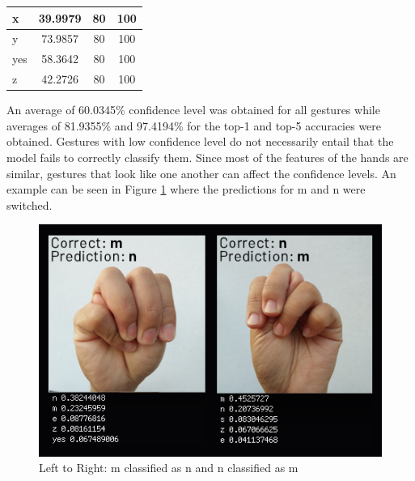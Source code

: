 \documentclass[journal]{./IEEE/IEEEtran}
\begin{document}
\begin{table}[ht!]
\begin{tabular}{|l|c|c|c|}
x                                      & 39.9979                   & 80                      & 100                     \\ \hline
y                                      & 73.9857                   & 80                      & 100                     \\ \hline
yes                                    & 58.3642                   & 80                      & 100                     \\ \hline
z                                      & 42.2726                   & 80                      & 100                     \\ \hline
\end{tabular}
\end{table}

\indent An average of 60.0345\% confidence level was obtained for all gestures while averages of 81.9355\% and 97.4194\% for the top-1 and top-5 accuracies were obtained.
\newline
\indent Gestures with low confidence level do not necessarily entail that the model fails to correctly classify them. Since most of the features of the hands are similar, gestures that look like one another can affect the confidence levels. An example can be seen in Figure \ref{fig:wrong_results} where the predictions for m and n were switched. 

\begin{figure}[ht!]
    \centering
    \includegraphics[width=1\linewidth]{./images/wrong_results.png}
    \caption{Left to Right: m classified as n and n classified as m}
    \label{fig:wrong_results}
\end{figure}
\end{document}
